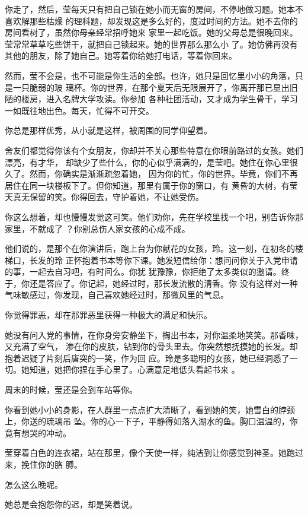 \documentclass[12pt,a4paper]{article}
\begin{document}
		你走了，然后，莹每天只有把自己锁在她小而无窗的房间，不停地做习题。她本不喜欢解那些枯燥
	的理科题，却发现这是多么好的，度过时间的方法。她不去你的房间看树了，虽然你母亲经常招呼她来
	家里一起吃饭。她的父母总是很晚回来。莹常常草草吃些饼干，就把自己锁起来。她的世界那么那么小
	了。她仿佛再没有其他的朋友，除了她自己。她等着你给她打电话，等着你回来。


		然而，莹不会是，也不可能是你生活的全部。也许，她只是回忆里小小的角落，只是一只脆弱的玻
	璃杯。你的世界，在那个夏天后无限展开了，你离开那已显出旧陋的楼房，进入名牌大学攻读。你参加
	各种社团活动，又才成为学生骨干，学习一如既往地出色。每天，忙得不可开交。

		你总是那样优秀，从小就是这样，被周围的同学仰望着。

		舍友们都觉得你该有个女朋友，你却并不关心那些特意在你眼前路过的女孩。她们漂亮，有才华，
	却缺少了些什么，你的心似乎满满的，是莹吧。她住在你心里很久了。然而，你确实是渐渐疏忽着她，
	因为你的忙，你的世界。毕竟，你们不再居住在同一块楼板下了。但你知道，那里有属于你的窗口，有
	黄昏的大树，有莹天真无保留的笑。你得回去，守护着她，不让她受伤。

		你这么想着，却也慢慢发觉这可笑。他们劝你，先在学校里找一个吧，别告诉你那家里，不就成了
	？你别总伤人家女孩的心成不成。

		他们说的，是那个在你演讲后，跑上台为你献花的女孩，玲。这一刻，在初冬的楼梯口，长发的玲
	正怀抱着书本等你下课。她发短信给你：想问问你关于入党申请的事，一起去自习吧，有时间么。你犹
	犹豫豫，你拒绝了太多类似的邀请。终于，你还是答应了。你记起，她经过时，那长发流散的清香。你
	没有这样对一种气味敏感过，你发现，自己喜欢她经过时，那微风里的气息。


		你觉得罪恶，却在那罪恶里获得一种极大的满足和快乐。


		她没有问入党的事情，在你身旁安静坐下，掏出书本，对你温柔地笑笑。那香味，又充满了空气，
	渗在你的皮肤，钻到你的骨头里去。你突然想抚摸她的长发。却抱着迟疑了片刻后唐突的一笑，作为回
	应。玲是多聪明的女孩，她已经洞悉了一切。她知道，她把你捏在手心里了。心满意足地低头看起书来
	。


		周末的时候，莹还是会到车站等你。

		你看到她小小的身影，在人群里一点点扩大清晰了，看到她的笑，她雪白的脖颈上，你送的琉璃吊
	坠。你的心一下子，平静得如落入湖水的鱼。胸口温温的，你竟有想哭的冲动。

		莹穿着白色的连衣裙，站在那里，像个天使一样，纯洁到让你感觉到神圣。她跑过来，挽住你的胳
	膊。

		怎么这么晚呢。

		她总是会抱怨你的迟，却是笑着说。
\end{document}
